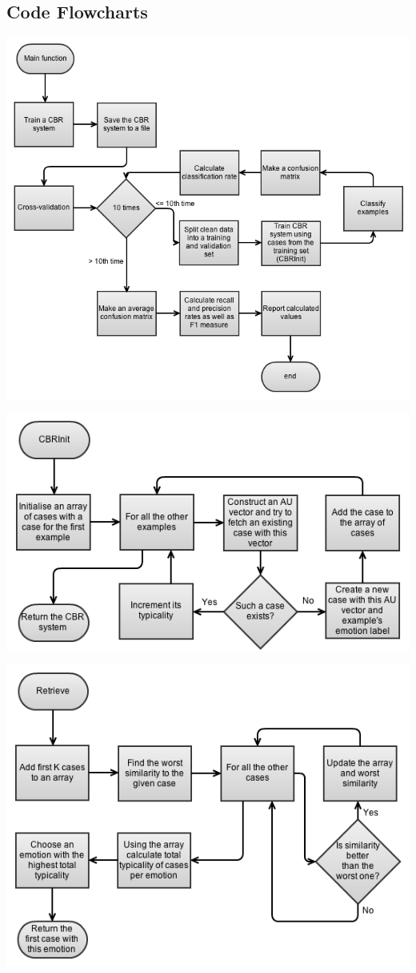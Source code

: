 \documentclass[12pt]{article}
\begin{document}
\subsection*{Code Flowcharts}

\begin{center}
  \includegraphics[scale=0.7]{report-images/Main.png}
\end{center}

\begin{center}
  \includegraphics[scale=0.7]{report-images/CBRInit.png}
\end{center}

\begin{center}
  \includegraphics[scale=0.7]{report-images/Retrieve.png}
\end{center}
\end{document}
